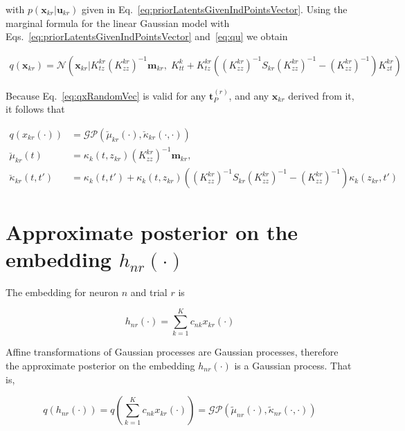 \documentclass[12pt]{article}
\begin{document}
\noindent with $p(\mathbf{x}_{kr}|\mathbf{u}_{kr})$ given in
Eq.~\ref{eq:priorLatentsGivenIndPointsVector}. Using the marginal formula for
the linear Gaussian model \citep[][Eq.~2.115]{bishop06} with
Eqs.~\ref{eq:priorLatentsGivenIndPointsVector} and~\ref{eq:qu} we obtain

\begin{align}
    q(\mathbf{x}_{kr})=\mathcal{N}\left(\mathbf{x}_{kr}|K_{tz}^{kr}(K_{zz}^{kr})^{-1}\mathbf{m}_{kr},\;K_{tt}^k+K_{tz}^{kr}\left((K_{zz}^{kr})^{-1}S_{kr}(K_{zz}^{kr})^{-1}-(K_{zz}^{kr})^{-1  }\right)K_{zt}^{kr}\right)
    \label{eq:qxRandomVec}
\end{align}

Because Eq.~\ref{eq:qxRandomVec} is valid for any $\mathbf{t}_P^{(r)}$, and any
$\mathbf{x}_{kr}$ derived from it, it follows that


\begin{equation}
    \begin{aligned}
        q(x_{kr}(\cdot))&=\mathcal{GP}\left(\breve\mu_{kr}(\cdot),\breve\kappa_{kr}(\cdot,\cdot)\right)\\
        \breve\mu_{kr}(t)&=\kappa_k(t,z_{kr})(K_{zz}^{kr})^{-1}\mathbf{m}_{kr},\\
        \breve\kappa_{kr}(t,t')&=\kappa_k(t,t')+\kappa_k(t,z_{kr})\left((K_{zz}^{kr})^{-1}S_{kr}(K_{zz}^{kr})^{-1}-(K_{zz}^{kr})^{-1}\right)\kappa_k(z_{kr},t')
    \end{aligned}
    \label{eq:qx}
\end{equation}

\section{Approximate posterior on the embedding $h_{nr}(\cdot)$}

The embedding for neuron $n$ and trial $r$ is

\begin{equation}
    h_{nr}(\cdot) = \sum_{k=1}^Kc_{nk}x_{kr}(\cdot)
    \label{eq:embedding_nr}
\end{equation}

Affine transformations of Gaussian processes are Gaussian processes, therefore
the approximate posterior on the embedding
$h_{nr}(\cdot)$ is a Gaussian process. That is,

\begin{equation}
    q(h_{nr}(\cdot))=q\left(\sum_{k=1}^Kc_{nk}x_{kr}(\cdot)\right)=\mathcal{GP}(\tilde{\mu}_{nr}(\cdot),\tilde{\kappa}_{nr}(\cdot,\cdot))
\end{equation}
\end{document}
